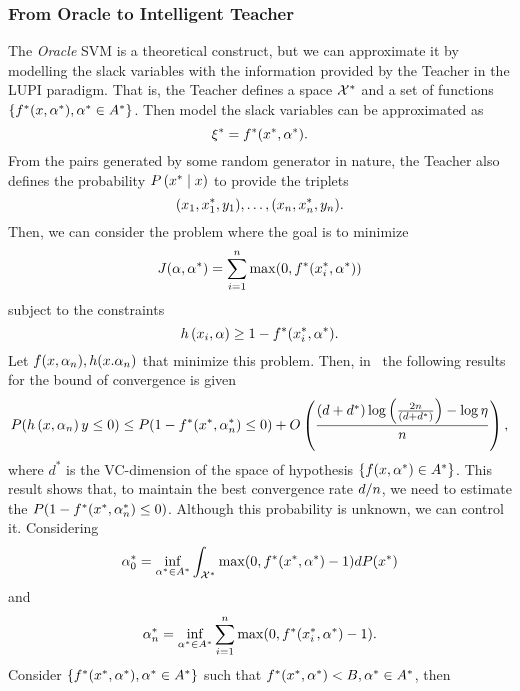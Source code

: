 \subsubsection*{From Oracle to Intelligent Teacher}
The \emph{Oracle} SVM is a theoretical construct, but we can approximate it by modelling the slack variables with the information provided by the Teacher in the LUPI paradigm.
That is, the Teacher defines a space $\mathcal{X}^*$ and a set of functions $\left\{f^*(x, \alpha^*) , \alpha^* \in A^*\right\}$. Then model the slack variables can be approximated as
\begin{equation}
    \nonumber
    \xi^* = f^*(x^*, \alpha^*) .
\end{equation}
From the pairs generated by some random generator in nature, the Teacher also defines the probability $P\left( x^* \;\middle\vert\; x \right)$ to provide the triplets
\begin{equation}
    \nonumber
    (x_1, x^*_1, y_1), \ldots, (x_n, x^*_n, y_n) .
\end{equation}
Then, we can consider the problem where the goal is to minimize
$$ J(\alpha, \alpha^*) = \sum_{i=1}^n \max(0, f^*(x_i^*, \alpha^*)) $$
subject to the constraints
$$ h\left(x_i, \alpha\right) \geq 1 - f^*(x_i^*, \alpha^*).$$
Let $f(x, \alpha_n), h(x. \alpha_n)$ that minimize this problem. Then, in~\cite[Proposition~2]{VapnikV09} the following results for the bound of convergence is given
\begin{equation}
    \nonumber
    P(h\left(x, \alpha_n\right) y \leq 0) \leq P(1 - f^*(x^*, \alpha^*_n) \leq 0) + O\left( \frac{(d + d^*) \log\left(\frac{2n}{(d + d^*)} \right) - \log\eta}{n}  \right) ,
\end{equation}
where $d^*$ is the VC-dimension of the space of hypothesis $\left\{f(x, \alpha^*) \in A^*\right\}$. This result shows that, to maintain the best convergence rate $d/n$, we need to estimate the $P(1 - f^*(x^*, \alpha^*_n) \leq 0)$. Although this probability is unknown,  we can control it. Considering
\begin{equation}
    \nonumber
    \alpha^*_0 = \inf_{\alpha^* \in A^*} \int_{\mathcal{X}^*} \max(0, f^*(x^*, \alpha^*)- 1) dP(x^*)
\end{equation}
and
\begin{equation}
    \nonumber
    \alpha^*_n = \inf_{\alpha^* \in A^*} \sum_{i=1}^n \max(0, f^*(x^*_i, \alpha^*)- 1) .
\end{equation}
Consider $\left\{f^*(x^*, \alpha^*), \alpha^* \in A^*\right\}$ such that $f^*(x^*, \alpha^*) < B, \alpha^* \in A^*$, then 
